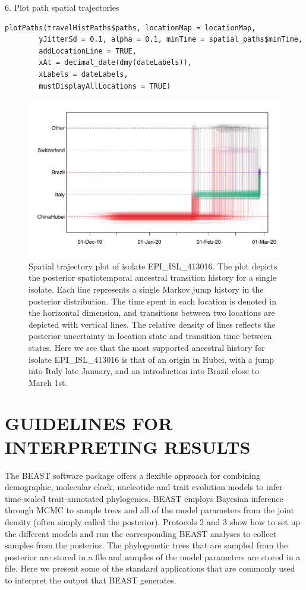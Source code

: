 \documentclass{article}
\newcommand{\code}[1]{
{\upshape\ttfamily{#1}}}
\begin{document}
6. Plot path spatial trajectories
\begin{verbatim}
plotPaths(travelHistPaths$paths, locationMap = locationMap,
        yJitterSd = 0.1, alpha = 0.1, minTime = spatial_paths$minTime,
        addLocationLine = TRUE,
        xAt = decimal_date(dmy(dateLabels)),
        xLabels = dateLabels,
        mustDisplayAllLocations = TRUE)
\end{verbatim}

\begin{figure}[!ht]
    \centering
    \includegraphics[width=1.0\textwidth]{figs/travel_trajectory.pdf}
    \caption{Spatial trajectory plot of isolate EPI\_ISL\_413016. The plot depicts the posterior spatiotemporal ancestral transition history for a single isolate. Each line represents a single Markov jump history in the posterior distribution. The time spent in each location is denoted in the horizontal dimension, and transitions between two locations are depicted with vertical lines. The relative density of lines reflects the posterior uncertainty in location state and transition time between states. Here we see that the most supported ancestral history for isolate EPI\_ISL\_413016 is that of an origin in Hubei, with a jump into Italy late January, and an introduction into Brazil close to March 1st.}
    \label{fig:trajectory}
\end{figure}


\section*{GUIDELINES FOR INTERPRETING RESULTS}

The BEAST software package offers a flexible approach for combining demographic, molecular clock, nucleotide and trait evolution models to infer time-scaled trait-annotated phylogenies.
BEAST employs Bayesian inference through MCMC to sample trees and all of the model parameters from the joint density (often simply called the posterior).
Protocols 2 and 3 show how to set up the different models and run the corresponding BEAST analyses to collect samples from the posterior.
The phylogenetic trees that are sampled from the posterior are stored in a\code{.trees} file and samples of the model parameters are stored in a\code{.log} file.
Here we present some of the standard applications that are commonly used to interpret the output that BEAST generates.
\end{document}
